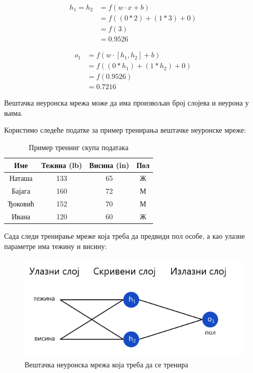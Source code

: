 \documentclass[12pt, а4paper]{article}
\begin{document}
\begin{equation}
\begin{split}
h_1 = h_2 & = f(w \cdot x + b) \\
& = f((0 * 2) + (1 * 3) + 0) \\
& = f(3) \\
& = 0.9526
\end{split}
\end{equation}

\begin{equation}
\begin{split}
o_1 & = f(w \cdot [h_1, h_2] + b) \\
& = f((0 * h_1) + (1 * h_2) + 0) \\
& = f(0.9526) \\
& = 0.7216
\end{split}
\end{equation}

Вештачка неуронска мрежа може да има произвољан број слојева и неурона у њима.

Користимо следеће податке за пример тренирања вештачке неуронске мреже:
\begin{table}[ht]
\centering
 \begin{tabular}{| c | c | c | c |}
  \hline
  Име & Тежина (lb) & Висина (in) & Пол \\
  \hline
  Наташа & 133 & 65 & Ж\\
  Бајага & 160 & 72 & М\\
  Ђоковић & 152 & 70 & М\\
  Ивана & 120 & 60 & Ж\\
  \hline
 \end{tabular}
 \caption{Пример тренинг скупа података}
\end{table}

Сада следи тренирање мреже која треба да предвиди пол особе, а као
улазне параметре има тежину и висину:

\begin{figure}[H]
  \centering
      \includegraphics[scale=0.6]{slike/neuronskaMrezaTren.png}
  \caption{Вештачка неуронска мрежа која треба да се тренира}
  \label{fig:nn_osnovaTren}
\end{figure}
\end{document}

